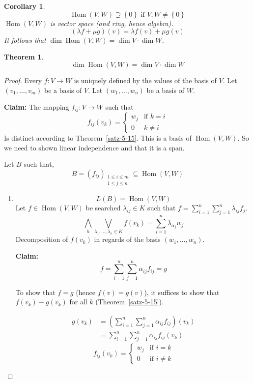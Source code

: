 \documentclass[a4paper,landscape,twocolumn]{article}
\newcommand\set[1]{\left\{#1\right\}}
\newtheorem{theorem}{Theorem}[section]
\newtheorem{cor}{Corollary}[section]
\DeclareMathOperator\Hom{Hom} %
\begin{document}
\begin{cor}
  \[ \Hom(V, W) \supsetneq \set{0} \text{ if } V,W \neq \set{0} \]
  $\Hom(V,W)$ is vector space (and ring, hence algebra).
  \[ (\lambda f + \mu g)(v) = \lambda f(v) + \mu g(v) \]
  It follows that $\dim{\Hom(V,W)} = \dim{V} \cdot \dim{W}$.
\end{cor}
\begin{theorem}
  \label{satz-5-18}
  \[ \dim{\Hom(V,W)} = \dim{V} \cdot \dim{W} \]
\end{theorem}
\begin{proof}
  Every $f: V \rightarrow W$ is uniquely defined by the values of the basis of $V$.
  Let $(v_1, \dots, v_m)$ be a basis of $V$. Let $(w_1, \dots, w_n)$ be a basis of $W$.

  \textbf{Claim:} The mapping $f_{ij}: V \rightarrow W$ such that
  \[
    f_{ij}(v_k) = \begin{cases}
      w_j & \text{if } k = i \\
      0 & k \neq i
    \end{cases}
  \]
  Is distinct according to Theorem~\ref{satz-5-15}.
  This is a basis of $\Hom(V, W)$. So we need to shown linear independence and
  that it is a span.

  Let $B$ such that,
  \[
    B = \left(f_{ij}\right)_{\substack{1 \leq i \leq m \\ 1 \leq j \leq n}}
    \subseteq \Hom(V, W)
  \]
  \begin{enumerate}
    \item
      \[ L(B) = \Hom(V, W) \]
      Let $f \in \Hom(V, W)$ be searched $\lambda_{ij} \in K$
      such that $f = \sum_{i=1}^n \sum_{j=1}^n \lambda_{ij} f_{j}$.
      \[ \bigwedge_{h} \bigvee_{\lambda_1,\dots,\lambda_n \in K} f(v_k) = \sum_{i=1}^n \lambda_{\alpha_j} w_j \]
      Decomposition of $f(v_k)$ in regards of the basis $(w_1, \dots, w_n)$.

      \textbf{Claim:}
      \[ f = \sum_{i=1}^n \sum_{j=1}^n \alpha_{ij} f_{ij} = g \]

      To show that $f = g$ (hence $f(v) = g(v)$),
      it suffices to show that $f(v_k) - g(v_k)$ for all $k$ (Theorem~\ref{satz-5-15}).

      \begin{align*}
        g(v_k) &= \left(\sum_{i=1}^n \sum_{j=1}^n \alpha_{ij} f_{ij}\right) (v_k) \\
          &= \sum_{i=1}^n \sum_{j=1}^n \alpha_{ij} f_{ij}(v_k)
      \end{align*}
      \[
        f_{ij}(v_k) = \begin{cases}
          w_j & \text{if } i = k \\
          0 & \text{if } i \neq k
        \end{cases}
      \]


\end{enumerate}
\end{proof}
\end{document}
